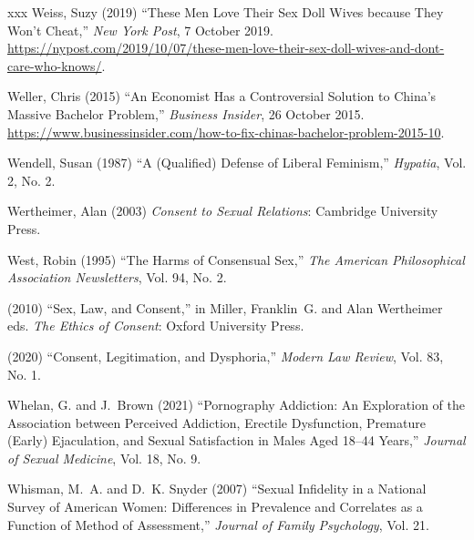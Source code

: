 \documentclass[]{jlreq} \usepackage{mystyle}
\begin{document}
\begin{thebibliography}{xxx}
Weiss, Suzy (2019) ``These Men Love Their Sex Doll Wives because They Won't
  Cheat,'' \emph{New York Post}, 7 October 2019.
  \url{https://nypost.com/2019/10/07/these-men-love-their-sex-doll-wives-and-dont-care-who-knows/}.

Weller, Chris (2015) ``An Economist Has a Controversial Solution to China's
  Massive Bachelor Problem,'' \emph{Business Insider}, 26 October 2015.
  \url{https://www.businessinsider.com/how-to-fix-chinas-bachelor-problem-2015-10}.

Wendell, Susan (1987) ``A (Qualified) Defense of Liberal Feminism,'' \textit{
  Hypatia}, Vol. 2, No. 2.

Wertheimer, Alan (2003)  \textit{ Consent to Sexual Relations}: Cambridge
  University Press.

West, Robin (1995) ``The Harms of Consensual Sex,'' \textit{ The American
  Philosophical Association Newsletters}, Vol. 94, No. 2.

 \bysame{}  (2010) ``Sex, Law, and Consent,'' in Miller, Franklin~G. and Alan
  Wertheimer eds.   \textit{ The Ethics of Consent}: Oxford University Press.

 \bysame{}  (2020) ``Consent, Legitimation, and Dysphoria,'' \textit{ Modern
  Law Review}, Vol. 83, No. 1.

Whelan, G. and J.~Brown (2021) ``Pornography Addiction: An Exploration of the
  Association between Perceived Addiction, Erectile Dysfunction, Premature
  (Early) Ejaculation, and Sexual Satisfaction in Males Aged 18--44 Years,''
  \textit{ Journal of Sexual Medicine}, Vol. 18, No. 9.

Whisman, M.~A. and D.~K. Snyder (2007) ``Sexual Infidelity in a National Survey
  of American Women: Differences in Prevalence and Correlates as a Function of
  Method of Assessment,'' \textit{ Journal of Family Psychology}, Vol. 21.


\end{thebibliography}
\end{document}
